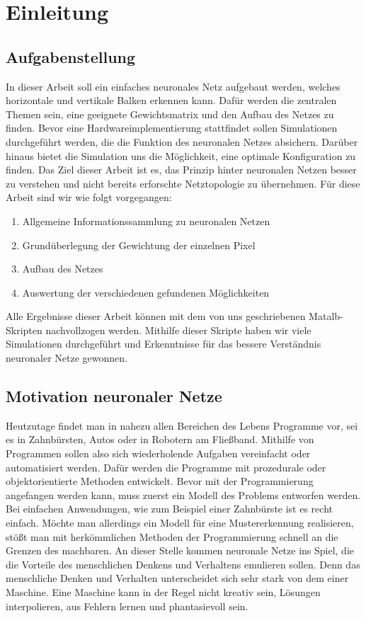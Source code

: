 \section{Einleitung}

\subsection{Aufgabenstellung}
In dieser Arbeit soll ein einfaches neuronales Netz aufgebaut werden, welches horizontale und vertikale Balken erkennen kann. Dafür werden die zentralen Themen sein, eine geeignete Gewichtsmatrix und den Aufbau des Netzes zu finden. Bevor eine Hardwareimplementierung stattfindet sollen Simulationen durchgeführt werden, die die Funktion des neuronalen Netzes absichern. Darüber hinaus bietet die Simulation uns die Möglichkeit, eine optimale Konfiguration zu finden. Das Ziel dieser Arbeit ist es, das Prinzip hinter neuronalen Netzen besser zu verstehen und nicht bereits erforschte Netztopologie zu übernehmen. Für diese Arbeit sind wir wie folgt vorgegangen:
 
\begin{enumerate}
	\item Allgemeine Informationssammlung zu neuronalen Netzen
	\item Grundüberlegung der Gewichtung der einzelnen Pixel
	\item Aufbau des Netzes
	\item Auswertung der verschiedenen gefundenen Möglichkeiten
\end{enumerate}

Alle Ergebnisse dieser Arbeit können mit dem von uns geschriebenen Matalb-Skripten nachvollzogen werden. Mithilfe dieser Skripte haben wir viele Simulationen durchgeführt und Erkenntnisse für das bessere Verständnis neuronaler Netze gewonnen.

\subsection{Motivation neuronaler Netze}
Heutzutage findet man in nahezu allen Bereichen des Lebens Programme vor, sei es in Zahnbürsten, Autos oder in Robotern am Fließband. Mithilfe von Programmen sollen also sich wiederholende Aufgaben vereinfacht oder automatisiert werden. Dafür werden die Programme mit prozedurale oder objektorientierte Methoden entwickelt. Bevor mit der Programmierung angefangen werden kann, muss zuerst ein Modell des Problems entworfen werden. Bei einfachen Anwendungen, wie zum Beispiel einer Zahnbürste ist es recht einfach. Möchte man allerdings ein Modell für eine Mustererkennung realisieren, stößt man mit herkömmlichen Methoden der Programmierung schnell an die Grenzen des machbaren. An dieser Stelle kommen neuronale Netze ins Spiel, die die Vorteile des menschlichen Denkens und Verhaltens emulieren sollen. Denn das menschliche Denken und Verhalten unterscheidet sich sehr stark von dem einer Maschine. Eine Maschine kann in der Regel nicht kreativ sein, Lösungen interpolieren, aus Fehlern lernen und phantasievoll sein.

